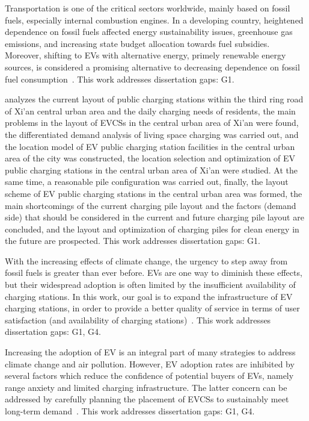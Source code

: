 \documentclass[letterpaper, 12pt, oneside, doublespacing]{Thesis}
\begin{document}
\noindent Transportation is one of the critical sectors worldwide, mainly based on fossil fuels, especially internal combustion engines. In a developing country, heightened dependence on fossil fuels affected energy sustainability issues, greenhouse gas emissions, and increasing state budget allocation towards fuel subsidies. Moreover, shifting to EVs with alternative energy, primely renewable energy sources, is considered a promising alternative to decreasing dependence on fossil fuel consumption~\cite{initial_location_2023}. This work addresses dissertation gaps: G1.



\noindent \cite{layout_and_2023} analyzes the current layout of public charging stations within the third ring road of Xi'an central urban area and the daily charging needs of residents, the main problems in the layout of EVCSs in the central urban area of Xi'an were found, the differentiated demand analysis of living space charging was carried out, and the location model of EV public charging station facilities in the central urban area of the city was constructed, the location selection and optimization of EV public charging stations in the central urban area of Xi'an were studied. At the same time, a reasonable pile configuration was carried out, finally, the layout scheme of EV public charging stations in the central urban area was formed, the main shortcomings of the current charging pile layout and the factors (demand side) that should be considered in the current and future charging pile layout are concluded, and the layout and optimization of charging piles for clean energy in the future are prospected. This work addresses dissertation gaps: G1.



\noindent With the increasing effects of climate change, the urgency to step away from fossil fuels is greater than ever before. EVs are one way to diminish these effects, but their widespread adoption is often limited by the insufficient availability of charging stations. In this work, our goal is to expand the infrastructure of EV charging stations, in order to provide a better quality of service in terms of user satisfaction (and availability of charging stations)~\cite{maximum_flow-based_2023}. This work addresses dissertation gaps: G1, G4.



\noindent Increasing the adoption of EV is an integral part of many strategies to address climate change and air pollution. However, EV adoption rates are inhibited by several factors which reduce the confidence of potential buyers of EVs, namely range anxiety and limited charging infrastructure. The latter concern can be addressed by carefully planning the placement of EVCSs to sustainably meet long-term demand~\cite{on_the_2023}. This work addresses dissertation gaps: G1, G4.
\end{document}
